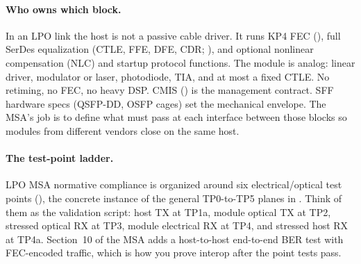 \paragraph{Who owns which block.}
In an LPO link the host is not a passive cable driver. It runs KP4 FEC
(), full SerDes equalization (CTLE, FFE, DFE, CDR;
), and optional nonlinear compensation
(NLC) and startup protocol functions. The module is analog: linear driver,
modulator or laser, photodiode, TIA, and at most a fixed CTLE. No retiming, no
FEC, no heavy DSP. CMIS () is the management contract. SFF
hardware specs (QSFP-DD, OSFP cages) set the mechanical envelope. The MSA's job
is to define what must pass at each interface between those blocks so modules
from different vendors close on the same host.


\paragraph{The test-point ladder.}
LPO MSA normative compliance is organized around six electrical/optical test
points (), the concrete instance of the general TP0-to-TP5 planes
in . Think of them as the validation script: host TX at
TP1a, module optical TX at TP2, stressed optical RX at TP3, module electrical RX
at TP4, and stressed host RX at TP4a. Section~10 of the MSA adds a host-to-host
end-to-end BER test with FEC-encoded traffic, which is how you prove interop after
the point tests pass.

